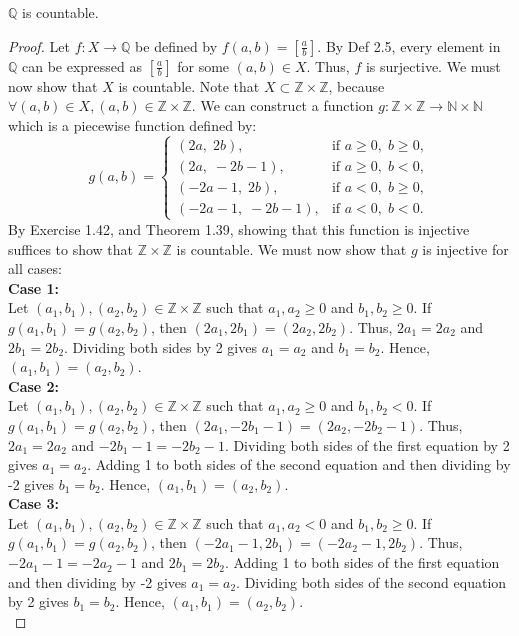 \documentclass[11pt]{article}
\begin{document}
\begin{theorem}[2.10]

$\mathbb{Q}$ is countable.
\end{theorem}
\begin{proof}
Let $f: X \rightarrow \mathbb{Q}$ be defined by $f(a,b) = \left[\frac{a}{b}\right]$. By Def 2.5, every element in $\mathbb{Q}$ can be expressed as $\left[\frac{a}{b}\right]$ for some $(a,b) \in X$. Thus, $f$ is surjective. We must now show that
$X$ is countable. Note that $X \subset \mathbb{Z} \times \mathbb{Z}$, because $\forall (a,b) \in X, (a,b) \in \mathbb{Z} \times \mathbb{Z}$. We can construct a function $g: \mathbb{Z} \times \mathbb{Z} \rightarrow \mathbb{N} \times \mathbb{N}$ which is a piecewise function defined by:
\[
g(a,b) =
\begin{cases}
(2a,\; 2b), & \text{if } a \ge 0,\; b \ge 0, \\[6pt]
(2a,\; -2b - 1), & \text{if } a \ge 0,\; b < 0, \\[6pt]
(-2a - 1,\; 2b), & \text{if } a < 0,\; b \ge 0, \\[6pt]
(-2a - 1,\; -2b - 1), & \text{if } a < 0,\; b < 0.
\end{cases}
\]
By Exercise 1.42, and Theorem 1.39, showing that this function is injective suffices to show that $\mathbb{Z} \times \mathbb{Z}$ is countable.
We must now show that $g$ is injective for all cases: \\
\textbf{Case 1:} \\ Let $(a_1,b_1), (a_2,b_2) \in \mathbb{Z} \times \mathbb{Z}$ such that $a_1, a_2 \ge 0$ and $b_1, b_2 \ge 0$. If $g(a_1,b_1) = g(a_2,b_2)$, then $(2a_1, 2b_1) = (2a_2, 2b_2)$. Thus, $2a_1 = 2a_2$ and $2b_1 = 2b_2$. Dividing both sides by 2 gives $a_1 = a_2$ and $b_1 = b_2$. Hence, $(a_1,b_1) = (a_2,b_2)$.\\
\textbf{Case 2:} \\ Let $(a_1,b_1), (a_2,b_2) \in \mathbb{Z} \times \mathbb{Z}$ such that $a_1, a_2 \ge 0$ and $b_1, b_2 < 0$. If $g(a_1,b_1) = g(a_2,b_2)$, then $(2a_1, -2b_1 - 1) = (2a_2, -2b_2 - 1)$. Thus, $2a_1 = 2a_2$ and $-2b_1 - 1 = -2b_2 - 1$. Dividing both sides of the first equation by 2 gives $a_1 = a_2$. Adding 1 to both sides of the second equation and then dividing by -2 gives $b_1 = b_2$. Hence, $(a_1,b_1) = (a_2,b_2)$. \\
\textbf{Case 3:} \\ Let $(a_1,b_1), (a_2,b_2) \in \mathbb{Z} \times \mathbb{Z}$ such that $a_1, a_2 < 0$ and $b_1, b_2 \ge 0$. If $g(a_1,b_1) = g(a_2,b_2)$, then $(-2a_1 - 1, 2b_1) = (-2a_2 - 1, 2b_2)$. Thus, $-2a_1 - 1 = -2a_2 - 1$ and $2b_1 = 2b_2$. Adding 1 to both sides of the first equation and then dividing by -2 gives $a_1 = a_2$. Dividing both sides of the second equation by 2 gives $b_1 = b_2$. Hence, $(a_1,b_1) = (a_2,b_2)$. \\

\end{proof}
\end{document}
